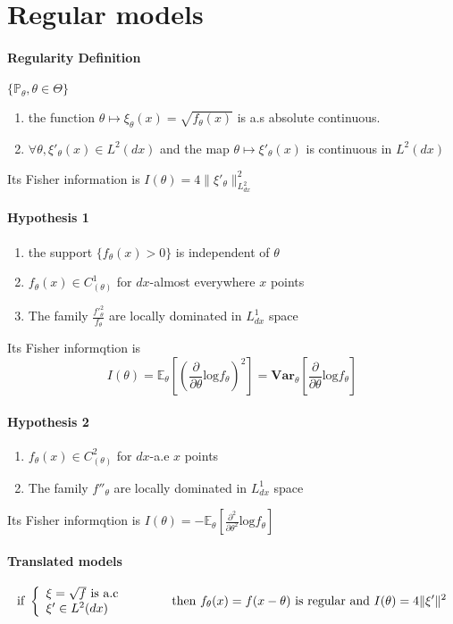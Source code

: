 \documentclass[a4paper,10pt]{article}
\begin{document}
\section{Regular models}
\paragraph{Regularity Definition}  $\{\mathbb{P}_{\theta},\theta \in \Theta\}$
\begin{enumerate}
 \item the function $\theta \mapsto \xi_{\theta}(x)=\sqrt{f_{\theta}(x)}$ is a.s absolute continuous.
 \item $\forall \theta, \xi'_{\theta}(x) \in L^2(dx)$ and the map $\theta \mapsto \xi'_{\theta}(x)$ is continuous in $L^2(dx)$
\end{enumerate}
Its Fisher information is $I(\theta) = 4 \| \xi'_{\theta} \|^{2}_{L^2_{dx}}$
\paragraph{Hypothesis 1}
\begin{enumerate}
 \item the support $\{f_{\theta}(x)>0\}$ is independent of $\theta$
 \item $f_{\theta}(x) \in C^1_{(\theta)}$ for $dx$-almost everywhere $x$ points  
 \item The family {$\frac{f'^2_{\theta}}{f_{\theta}} $} are locally dominated in $L^1_{dx}$ space
\end{enumerate}
Its Fisher informqtion is 
\[
I(\theta) 
= \mathbb{E}_{\theta}[( \frac{\partial}{\partial \theta} \text{log}f_{\theta} )^2]
= \textbf{Var}_{\theta} [ \frac{\partial}{\partial \theta} \text{log} f_{\theta}]  
\]
\paragraph{Hypothesis 2}
\begin{enumerate}
 \item $f_{\theta}(x) \in C^2_{(\theta)}$ for $dx$-a.e $x$ points 
 \item The family {$f''_{\theta}$} are locally dominated in $L^1_{dx}$ space
\end{enumerate}
Its Fisher informqtion is $I(\theta) = -\mathbb{E}_{\theta}[ \frac{\partial^2}{\partial \theta^2} \text{log}f_{\theta} ]$

\paragraph{Translated models}
\[
\text{if }
\left\{
\begin{array}{l}
\xi = \sqrt{f} \text{ is a.c } \\
\xi' \in L^2(dx)
\end{array}\right.
\hspace{10mm}
\text{ then }
f_{\theta}(x)=f(x-\theta) \text{ is regular and } I(\theta)=4\| \xi' \|^2 
\]
\end{document}
